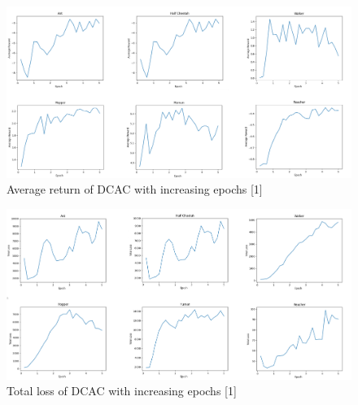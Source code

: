 \documentclass{article} %
\begin{document}
\begin{figure}[H]
\begin{center}
\includegraphics[scale=0.8]{images/average_return.png}
\end{center}
\caption{Average return of DCAC with increasing epochs [1]}
\label{averageReturn}
\end{figure}

\begin{figure}[H]
\begin{center}
\includegraphics[scale=0.8]{images/total_loss.png}
\end{center}
\caption{Total loss of DCAC with increasing epochs [1]}
\label{totalLoss}
\end{figure}
\end{document}
